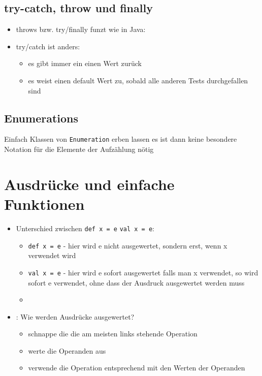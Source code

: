 \subsection{try-catch, throw und finally}
\begin{itemize}
  \item throws bzw. try/finally funzt wie in Java:
  
  
  
  \item try/catch ist anders:
  \begin{itemize}
    \item es gibt immer ein einen Wert zurück
    \item es weist einen default Wert zu, sobald alle anderen Tests
    durchgefallen sind
    
        
  \end{itemize}
\end{itemize}


\subsection{Enumerations}
Einfach Klassen von \texttt{Enumeration} erben lassen \und es ist dann
keine besondere Notation für die Elemente der Aufzählung nötig


\pagebreak


\section{Ausdrücke und einfache Funktionen}
\begin{itemize}
  \item Unterschied zwischen \texttt{def x = e} \und \texttt{val x = e}:
  \begin{itemize}
    \item \texttt{def x = e} - hier wird e nicht ausgewertet, sondern erst,
    wenn x verwendet wird
    \item \texttt{val x = e} - hier wird e sofort ausgewertet \und falls
    man x verwendet, so wird sofort e verwendet, ohne dass der Ausdruck
    ausgewertet werden muss
    \item 
  \end{itemize}
  \item {}: Wie werden Ausdrücke ausgewertet? \begin{itemize}
    \item schnappe die die am meisten links stehende Operation
    \item werte die Operanden aus
    \item verwende die Operation entsprechend mit den Werten der Operanden
  \end{itemize}
\end{itemize}


